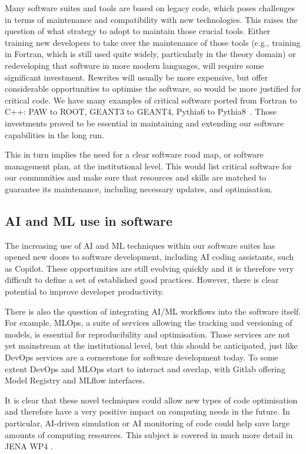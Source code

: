 Many software suites and tools are based on legacy code, which poses challenges in terms of maintenance and compatibility with new technologies. This raises the question of what strategy to adopt to maintain those crucial tools. Either training new developers to take over the maintenance of those tools (e.g., training in Fortran, which is still used quite widely, particularly in the theory domain) or redeveloping that software in more modern languages, will require some significant investment. Rewrites will usually be more expensive, but offer considerable opportunities to optimise the software, so would be more justified for critical code. We have many examples of critical software ported from Fortran to C++: PAW to ROOT, GEANT3 to GEANT4, Pythia6 to Pythia8~\cite{10.21468/SciPostPhysCodeb.8}. Those investments proved to be essential in maintaining and extending our software capabilities in the long run.

This in turn implies the need for a clear software road map, or software management plan, at the institutional level. This would list critical software for our communities and make sure that resources and skills are matched to guarantee its maintenance, including necessary updates, and optimisation.

\subsection{AI and ML use in software}

The increasing use of AI and ML techniques within our software suites has opened new doors to software development, including AI coding assistants, such as Copilot. These opportunities are still evolving quickly and it is therefore very difficult to define a set of established good practices. However, there is clear potential to improve developer productivity.

There is also the question of integrating AI/ML workflows into the software itself. For example, MLOps, a suite of services allowing the tracking and versioning of models, is essential for reproducibility and optimisation. Those services are not yet mainstream at the institutional level, but this should be anticipated, just like DevOps services are a cornerstone for software development today. To some extent DevOps and MLOps start to interact and overlap, with Gitlab offering Model Registry and MLflow interfaces.

It is clear that these novel techniques could allow new types of code optimisation and therefore have a very positive impact on computing needs in the future. In particular, AI-driven simulation or AI monitoring of code could help save large amounts of computing resources. This subject is covered in much more detail in JENA WP4 \cite{JENA_WG_Reports}.

